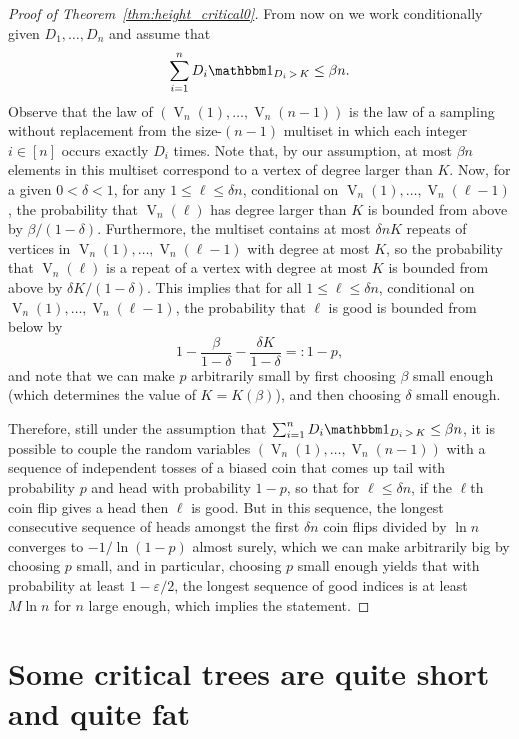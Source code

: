 \documentclass[AHL,Unicode,longabstracts,published]{cedram}
\DeclareMathOperator{\rseq}{V}
\newcommand{\I}[1]{{\mathbbm 1}_{#1}}
\begin{document}
\begin{proof}[Proof of Theorem~\ref{thm:height_critical0}]
From now on we work conditionally given $D_1,\dots, D_n$ and assume that
\[
\sum_{i=1}^n D_i\I{D_i\,>\,K}\leq \beta n.
\]
Observe that {the law of} $(\rseq_n(1),\dots, \rseq_n(n-1))$ is {the law of a} sampling without replacement from the size-$(n-1)$ multiset in which each integer $i\in [n]$ occurs exactly $D_i$ times. Note that, by our assumption, at most $\beta n$ elements in this multiset correspond to a vertex of degree larger than $K$. Now, for a given $0<\delta<1$, for any $1\leq \ell \leq \delta n$, conditional on $\rseq_n(1),\dots, \rseq_n(\ell-1)$, the probability that $\rseq_n(\ell)$ has degree larger than $K$ is bounded from above by $\beta/(1-\delta)$. Furthermore, the multiset contains at most $\delta n K$ repeats of vertices in $\rseq_n(1),\dots, \rseq_n(\ell-1)$ with degree at most $K$, so the probability that $\rseq_n(\ell)$ is a repeat of a vertex with degree at most $K$ is bounded from above by $\delta K/(1-\delta)$. This implies that for all $1 \le \ell \le \delta n$, conditional on $\rseq_n(1),\dots, \rseq_n(\ell-1)$, the probability that $\ell$ is good is bounded from below by
\[
1-\frac{\beta}{1-\delta} -\frac{\delta K}{1-\delta} =:1-p,
\]
and note that we can make $p$ arbitrarily small by first choosing $\beta$ small enough (which determines the value of $K=K(\beta)$), and then choosing $\delta$ small enough.

Therefore, still under the assumption that $\sum_{i=1}^n D_i\I{D_i\,>\,K}\leq \beta n$, it is possible to couple the random variables ${(\rseq_n(1),\dots, \rseq_n(n-1))}$ with a sequence of independent tosses of a biased coin that comes up tail with probability $p$ and head with probability $1-p$, so that for $\ell\leq \delta n$, {if the $\ell$th coin flip gives a head then $\ell$ is good.} But in this sequence, the longest consecutive sequence of heads amongst the first $\delta n$ coin flips divided by $\ln n$ converges to $-1/\ln(1-p)$ almost surely, which we can make arbitrarily big by choosing $p$ small, and in particular, choosing $p$ small enough yields that with probability at least $1-\varepsilon/2$, the longest sequence of good indices is at least $M\ln n$ for $n$ large enough, which implies the statement.
\end{proof}

\section{Some critical trees are quite short and quite fat}\label{sec:quite_short_quite_fat}
\end{document}
